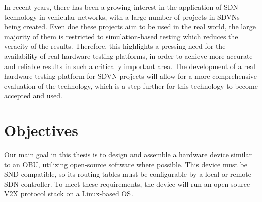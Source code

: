 
In recent years, there has been a growing interest in the application of SDN technology in vehicular networks, with a large number of projects in SDVNs being created. Even doe these projects aim to be used in the real world, the large majority of them is restricted to simulation-based testing which reduces the veracity of the results. Therefore, this highlights a pressing need for the availability of real hardware testing platforms, in order to achieve more accurate and reliable results in such a critically important area. The development of a real hardware testing platform for SDVN projects will allow for a more comprehensive evaluation of the technology, which is a step further for this technology to become accepted and used.


\section{Objectives} %
\label{sec:objectives}

Our main goal in this thesis is to design and assemble a hardware device similar to an OBU, utilizing open-source software where possible. This device must be SND compatible, so its routing tables must be configurable by a local or remote SDN controller. To meet these requirements, the device will run an open-source V2X protocol stack on a Linux-based OS.




